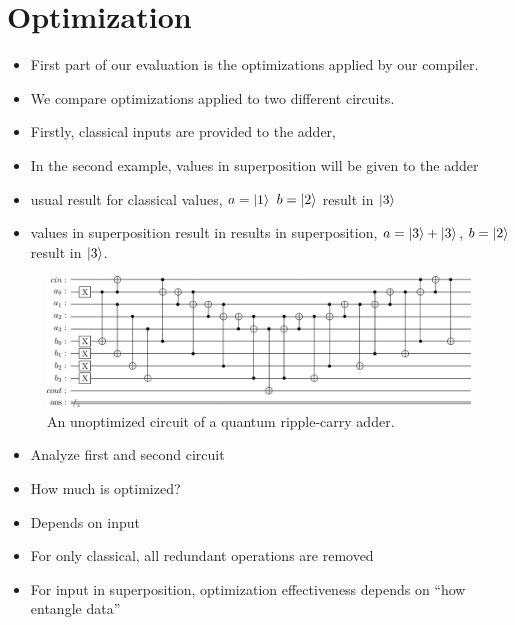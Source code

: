 \section{Optimization}
\label{sec:eval_optimization}
\begin{itemize}
    \item First part of our evaluation is the optimizations applied by our compiler.
    \item We compare optimizations applied to two different circuits. 
    \item Firstly, classical inputs are provided to the adder,
    \item In the second example, values in superposition will be given to the adder
    \item usual result for classical values, $a = \ket{1}$ $b = \ket{2}$ result in $\ket{3}$
    \item values in superposition result in results in superposition, $a = \ket{3} + \ket{3}$, $b = \ket{2}$ result in $\ket{3}$.
\end{itemize}

\begin{figure}[htp]
    \centering     
    \includegraphics[width=\textwidth]{../figures/images/adderCircuit.png}
    \caption{An unoptimized circuit of a quantum ripple-carry adder.}
    \label{fig:eval_adder_circuit}
\end{figure}

\begin{itemize}
    \item Analyze first and second circuit
    \item How much is optimized?
    \item Depends on input
    \item For only classical, all redundant operations are removed
    \item For input in superposition, optimization effectiveness depends on ``how entangle data''
\end{itemize}


